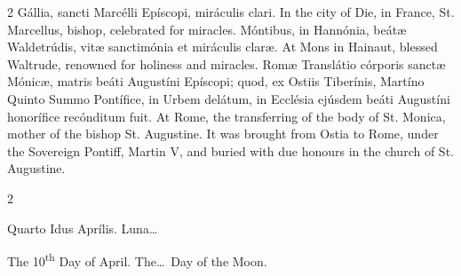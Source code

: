 \begin{paracol}{2}
 Gállia, sancti Marcélli Epíscopi, miráculis clari.
\switchcolumn
{}
In the city of Die, in France, St. 
 Marcellus, bishop, celebrated for miracles.
\switchcolumn*
{}
Móntibus, in Hannónia, 
 beátæ Waldetrúdis, vitæ sanctimónia et miráculis claræ.
\switchcolumn
{}
At Mons in Hainaut, blessed 
 Waltrude, renowned for holiness and miracles.
\switchcolumn*
{}
Romæ Translátio 
 córporis sanctæ Mónicæ, matris beáti Augustíni Epíscopi; quod, ex Ostiis 
 Tiberínis, Martíno Quinto Summo Pontífice, in Urbem delátum, in Ecclésia 
 ejúsdem beáti Augustíni honorífice recónditum fuit.
\switchcolumn
{}
At Rome, the transferring of the 
 body of St. Monica, mother of the bishop St. Augustine. It was brought 
 from Ostia to Rome, under the Sovereign Pontiff, Martin V, and buried with 
 due honours in the church of St. Augustine.
\switchcolumn*
{}
\end{paracol}


\begin{paracol}{2}
\begin{center}{\color{gregoriocolor} Quarto Idus Aprílis. 
 Luna\dots\ }\end{center}
\switchcolumn
{}
\begin{center}{\color{gregoriocolor} The 10\textsuperscript{th} Day of April. The\dots\ Day of the Moon.}\end{center}
\end{paracol}

